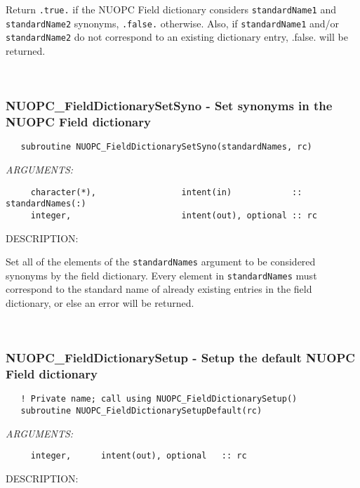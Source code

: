      Return {\tt .true.} if the NUOPC Field dictionary considers
     {\tt standardName1} and {\tt standardName2} synonyms, {\tt .false.} 
     otherwise. Also, if {\tt standardName1} and/or {\tt standardName2} do not 
     correspond to an existing dictionary entry, {.false.} will be returned. 
 
\mbox{}\hrulefill\ 
 
\subsubsection [NUOPC\_FieldDictionarySetSyno] {NUOPC\_FieldDictionarySetSyno - Set synonyms in the NUOPC Field dictionary}


\begin{verbatim}   subroutine NUOPC_FieldDictionarySetSyno(standardNames, rc)\end{verbatim}{\em ARGUMENTS:}
\begin{verbatim}     character(*),                 intent(in)            :: standardNames(:)
     integer,                      intent(out), optional :: rc\end{verbatim}
{\sf DESCRIPTION:\\ }


     Set all of the elements of the {\tt standardNames} argument to be considered
     synonyms by the field dictionary. Every element in {\tt standardNames} must
     correspond to the standard name of already existing entries in the field 
     dictionary, or else an error will be returned. 
 
\mbox{}\hrulefill\ 
 
\subsubsection [NUOPC\_FieldDictionarySetup] {NUOPC\_FieldDictionarySetup - Setup the default NUOPC Field dictionary}


\begin{verbatim}   ! Private name; call using NUOPC_FieldDictionarySetup()
   subroutine NUOPC_FieldDictionarySetupDefault(rc)\end{verbatim}{\em ARGUMENTS:}
\begin{verbatim}     integer,      intent(out), optional   :: rc\end{verbatim}
{\sf DESCRIPTION:\\ }


